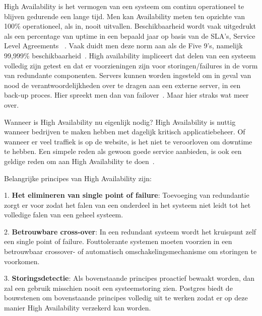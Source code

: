 

High Availability is het vermogen van een systeem om continu operationeel te blijven gedurende een lange tijd. Men kan Availability meten ten opzichte van 100\% operationeel, als in, nooit uitvallen. Beschikbaarheid wordt vaak uitgedrukt als een percentage van uptime in een bepaald jaar op basis van de SLA's, Service Level Agreements ~\autocite{Kumar2020}. Vaak duidt men deze norm aan als de Five 9's, namelijk 99,999\% beschikbaarheid~\autocite{Lutkevich2021}. High availability impliceert dat delen van een systeem volledig zijn getest en dat er voorzieningen zijn voor storingen/failures in de vorm van redundante componenten. Servers kunnen worden ingesteld om in geval van nood de verantwoordelijkheden over te dragen aan een externe server, in een back-up proces. Hier spreekt men dan van failover~\autocite{Technopedia2021a}. Maar hier straks wat meer over.

Wanneer is High Availability nu eigenlijk nodig?
High Availability is nuttig wanneer bedrijven te maken hebben met dagelijk kritisch applicatiebeheer. Of wanneer er veel traffiek is op de website, is het niet te veroorloven om downtime te hebben. Een simpele reden als gewoon goede service aanbieden, is ook een geldige reden om aan High Availability te doen~\autocite{CriticalCase2020}. 


Belangrijke principes van High Availability zijn:

1. \textbf{Het elimineren van single point of failure}: Toevoeging van redundantie zorgt er voor zodat het falen van een onderdeel in het systeem niet leidt tot het volledige falen van een geheel systeem.

2. \textbf{Betrouwbare cross-over}: In een redundant systeem wordt het kruispunt zelf een single point of failure. Fouttolerante systemen moeten voorzien in een betrouwbaar crossover- of automatisch omschakelingsmechanisme om storingen te voorkomen.

3. \textbf{Storingsdetectie}: Als bovenstaande principes proactief bewaakt worden, dan zal een gebruik misschien nooit een systeemstoring zien.
Postgres biedt de bouwstenen om bovenstaande principes volledig uit te werken zodat er op deze manier High Availability verzekerd kan worden.

